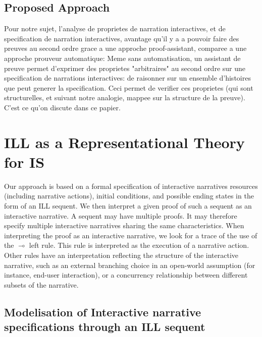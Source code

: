 \documentclass[runningheads,a4paper]{llncs}
\begin{document}
\subsection{Proposed Approach}
Pour notre sujet, l'analyse de proprietes de narration interactives, et de specification de narration interactives, avantage qu'il y a a pouvoir faire des preuves au second ordre grace a une approche proof-assistant, comparee a une approche prouveur automatique: Meme sans automatisation, un assistant de preuve permet d'exprimer des proprietes "arbitraires" au second ordre sur une specification de narrations interactives: de raisonner sur un ensemble d'histoires que peut generer la specification. Ceci permet de verifier ces proprietes (qui sont structurelles, et suivant notre analogie, mappee sur la structure de la preuve). C'est ce qu'on discute dans ce papier.
\section{ILL as a Representational Theory for IS}
%
Our approach is based on a formal specification of interactive narratives resources (including narrative actions), initial conditions, and possible ending states in the form of an ILL sequent. We then interpret a given proof of such a sequent as an interactive narrative. A sequent may have multiple proofs. It may therefore specify multiple interactive narratives sharing the same characteristics. When interpreting the proof as an interactive narrative, we look for a trace of the use of the $\multimap$ left rule. This rule is interpreted as the execution of a narrative action. Other rules have an interpretation reflecting the structure of the interactive narrative, such as an external branching choice in an open-world assumption (for instance, end-user interaction), or a concurrency relationship between different subsets of the narrative. 
\subsection{Modelisation of Interactive narrative specifications through an ILL sequent}
\end{document}
